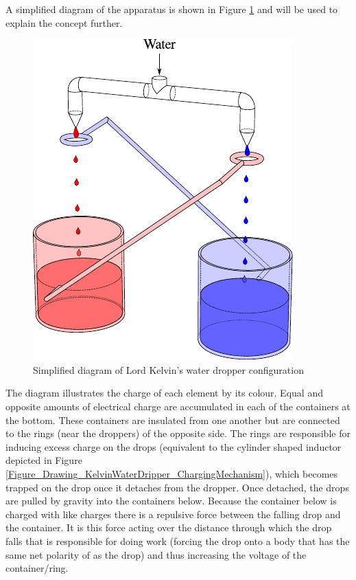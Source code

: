 A simplified diagram of the apparatus is shown in Figure \ref{Fig_Diagram_KelvinWaterDripper}
and will be used to explain the concept further.
\begin{figure}
    \centering
    \includegraphics{content/appendices/chargedWaterDrops/graphics/DripperOut}
    \caption{\label{Fig_Diagram_KelvinWaterDripper}Simplified diagram of Lord Kelvin's water dropper configuration}
\end{figure}


The diagram illustrates the charge of each element by its colour.
Equal and opposite amounts of electrical charge are accumulated in
each of the containers at the bottom. These containers are insulated
from one another but are connected to the rings (near the droppers)
of the opposite side. The rings are responsible for inducing excess
charge on the drops (equivalent to the cylinder shaped inductor depicted
in Figure \ref{Figure_Drawing_KelvinWaterDripper_ChargingMechanism}),
which becomes trapped on the drop once it detaches from the dropper.
Once detached, the drops are pulled by gravity into the containers
below. Because the container below is charged with like charges there
is a repulsive force between the falling drop and the container. It
is this force acting over the distance through which the drop falls
that is responsible for doing work (forcing the drop onto a body that
has the same net polarity of as the drop) and thus increasing the
voltage of the container/ring.


